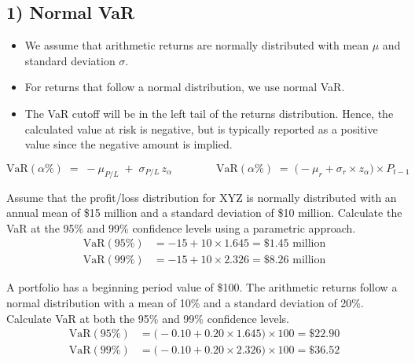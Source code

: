 \subsection{1) Normal VaR}
\begin{itemize}
\item We assume that arithmetic returns are normally distributed with mean $\mu$ and standard
      deviation $\sigma$.
\item For returns that follow a normal distribution, we use normal VaR.
\item The VaR cutoff will be in the left tail of the returns distribution. Hence, the calculated
      value at risk is negative, but is typically reported as a positive value since the negative
      amount is implied.
\end{itemize}

\begin{mrfmlbox}
\[ \mathrm{VaR}(\alpha\%) \;=\; -\mu_{P/L} \;+\; \sigma_{P/L}\, z_\alpha
   \qquad\qquad
   \mathrm{VaR}(\alpha\%) \;=\; \bigl(-\mu_r + \sigma_r \times z_\alpha\bigr) \times P_{t-1} \]
\end{mrfmlbox}

\begin{mrexbox}[title={Example 1 --- P/L data}]
Assume that the profit/loss distribution for XYZ is normally distributed with an annual mean of
\$15 million and a standard deviation of \$10 million. Calculate the VaR at the 95\% and 99\%
confidence levels using a parametric approach.
\tcblower
\small
\begin{align*}
\mathrm{VaR}(95\%) &= -15 + 10 \times 1.645 = \$1.45\text{ million}\\
\mathrm{VaR}(99\%) &= -15 + 10 \times 2.326 = \$8.26\text{ million}
\end{align*}
\end{mrexbox}

\begin{mrexbox}[title={Example 2 --- arithmetic return data}]
A portfolio has a beginning period value of \$100. The arithmetic returns follow a normal
distribution with a mean of 10\% and a standard deviation of 20\%. Calculate VaR at both the
95\% and 99\% confidence levels.
\tcblower
\small
\begin{align*}
\mathrm{VaR}(95\%) &= \bigl(-0.10 + 0.20 \times 1.645\bigr) \times 100 = \$22.90\\
\mathrm{VaR}(99\%) &= \bigl(-0.10 + 0.20 \times 2.326\bigr) \times 100 = \$36.52
\end{align*}
\end{mrexbox}


